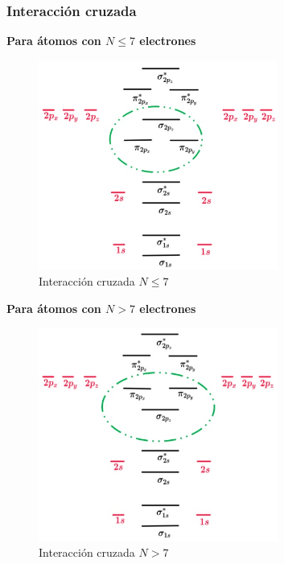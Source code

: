 \newpage

\subsubsection{Interacción cruzada}

\textbf{Para átomos con $N \leq 7 $ electrones}

\begin{figure}[H]
    \centering
    \includegraphics[width=0.7\textwidth]{./Figures/interaccionCruzada7a}
	\caption{Interacción cruzada $N \leq 7$}
	\label{fig:interaccionCruzada7a}
\end{figure}


\textbf{Para átomos con $N>7$ electrones}

\begin{figure}[H]
    \centering
    \includegraphics[width=0.7\textwidth]{./Figures/interaccionCruzada7b}
	\caption{Interacción cruzada $N > 7$}
	\label{fig:interaccionCruzada7b}
\end{figure}


